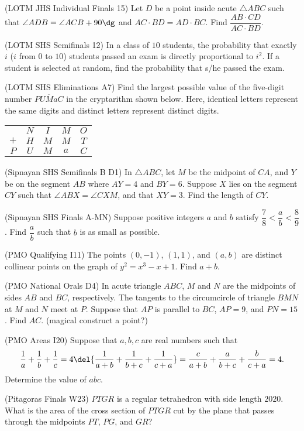 (LOTM JHS Individual Finals 15) Let $D$ be a point inside acute $\triangle ABC$ such that $\angle ADB = \angle ACB + 90\dg$ and $AC \cdot BD = AD \cdot BC$. Find $\dfrac{AB \cdot CD}{AC \cdot BD}$.

(LOTM SHS Semifinals 12) In a class of $10$ students, the probability that exactly $i$ ($i$ from $0$ to $10$) students passed an exam is directly proportional to $i^2$. If a student is selected at random, find the probability that s/he passed the exam.

(LOTM SHS Eliminations A7) Find the largest possible value of the five-digit number $\overline{PUMaC}$ in the cryptarithm shown below. Here, identical letters represent the same digits and distinct letters represent distinct digits.
\begin{center}
  \begin{tabular}{ccccc}
    & $N$ & $I$ & $M$ & $O$ \\
    $+$ & $H$ & $M$ & $M$ & $T$ \\ \hline
    $P$ & $U$ & $M$ & $a$ & $C$
  \end{tabular}
\end{center}

(Sipnayan SHS Semifinals B D1) In $\triangle ABC$, let $M$ be the midpoint of $CA$, and $Y$ be on the segment $AB$ where $AY = 4$ and $BY = 6$. Suppose $X$ lies on the segment $CY$ such that $\angle ABX = \angle CXM$, and that $XY = 3$. Find the length of $CY$.

(Sipnayan SHS Finals A-MN) Suppose positive integers $a$ and $b$ satisfy $\dfrac78 < \dfrac ab < \dfrac89$. Find $\dfrac ab$ such that $b$ is as small as possible.

(PMO Qualifying I11) The points $(0, -1)$, $(1, 1)$, and $(a, b)$ are distinct collinear points on the graph of $y^2 = x^3 - x + 1$. Find $a + b$.

(PMO National Orals D4) In acute triangle $ABC$, $M$ and $N$ are the midpoints of sides $AB$ and $BC$, respectively. The tangents to the circumcircle of triangle $BMN$ at $M$ and $N$ meet at $P$. Suppose that $AP$ is parallel to $BC$, $AP = 9$, and $PN = 15$. Find $AC$. (magical construct a point?)

(PMO Areas I20) Suppose that $a, b, c$ are real numbers such that $$\frac1a + \frac1b + \frac1c = 4\del{\frac1{a+b} + \frac1{b+c} + \frac1{c+a}} = \frac c{a+b} + \frac a{b+c} + \frac b{c+a} = 4.$$ Determine the value of $abc$.

(Pitagoras Finals W23) $PTGR$ is a regular tetrahedron with side length $2020$. What is the area of the cross section of $PTGR$ cut by the plane that passes through the midpoints $PT$, $PG$, and $GR$?

